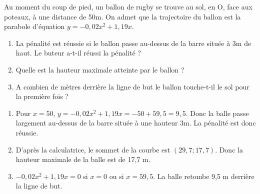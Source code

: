 \begin{exo}
	Au moment du coup de pied, un ballon de rugby se trouve au sol, en O, face aux poteaux, à une distance de 50m. On admet que la trajectoire du ballon est la parabole d'équation $y=-0,02x^2+1,19x$.

\label{rugby}	



%	
%
	
	
	
	
	\begin{enumerate}
		
		\item La pénalité est réussie si le ballon passe au-dessus de la barre située à 3m de haut. Le buteur a-t-il réussi la pénalité ?
		
		\item Quelle est la hauteur maximale atteinte par le ballon ?
		
		\item A combien de mètres derrière la ligne de but le ballon touche-t-il le sol pour la première fois ?
		
	\end{enumerate}	

\begin{sol*}
	\begin{enumerate}
	\item Pour $x=50$, $y=-0,02x^2+1,19x = -50+59,5 = 9,5$. Donc la balle passe largement au-dessus de la barre située à une hauteur 3m. La pénalité est donc réussie.
	\item D'après la calculatrice, le sommet de la courbe est $(29,7;17,7)$. Donc la hauteur maximale de la balle est de 17,7 m.
	\item $-0,02x^2+1,19x = 0$ si $x=0$ ou si $x=59,5$. La balle retombe 9,5 m derrière la ligne de but.
	\end{enumerate}		
\end{sol*}	
	
\end{exo}



